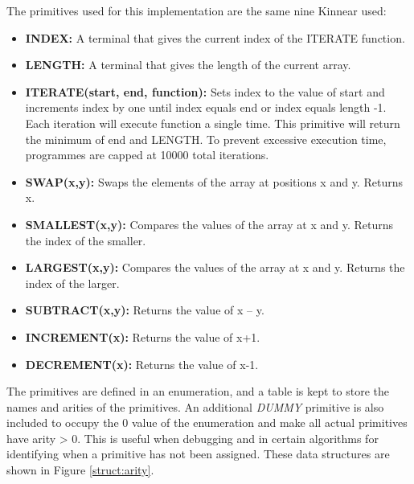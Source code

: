 \documentclass{article}
\begin{document}
		The primitives used for this implementation are the same nine Kinnear used:
		\begin{multicols}{2}
		\begin{itemize}
			\item \textbf{INDEX:} A terminal that gives the current index of the ITERATE function.
			\item \textbf{LENGTH:} A terminal that gives the length of the current array.
			\item \textbf{ITERATE(start, end, function):}  Sets index to the value of start and increments index by one until index equals end or index equals length -1. Each iteration will execute function a single time. This primitive will return the minimum of end and LENGTH. To prevent excessive execution time, programmes are capped at 10000 total iterations.
			\item \textbf{SWAP(x,y):}  Swaps the elements of the array at positions x and y. Returns x.
			\item \textbf{SMALLEST(x,y):} Compares the values of the array at x and y. Returns the index of the smaller.
			\item \textbf{LARGEST(x,y):} Compares the values of the array at x and y. Returns the index of the larger. 

			\item \textbf{SUBTRACT(x,y):} Returns the value of x – y.
			\item \textbf{INCREMENT(x):} Returns the value of x+1.
			\item \textbf{DECREMENT(x):} Returns the value of x-1.
		
		\end{itemize}
		\end{multicols}
	
		The primitives are defined in an enumeration, and a table is kept to store the names and arities of the primitives. An additional \textit{DUMMY} primitive is also included to occupy the 0 value of the enumeration and make all actual primitives have arity > 0. This is useful when debugging and in certain algorithms for identifying when a primitive has not been assigned. These data structures are shown in Figure \ref{struct:arity}.
		
\end{document}

